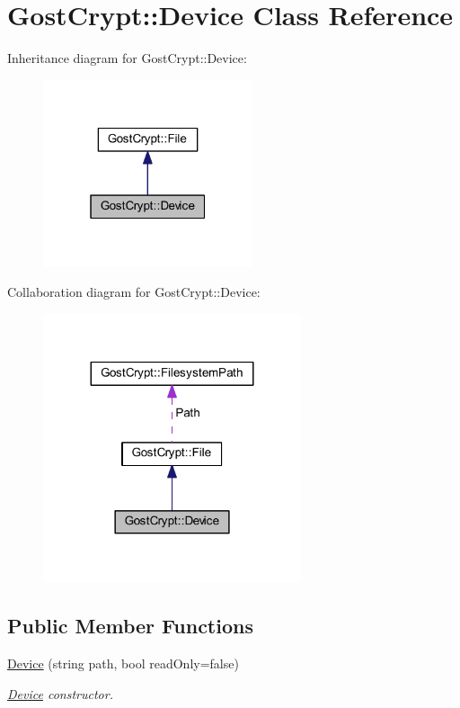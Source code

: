 \hypertarget{class_gost_crypt_1_1_device}{}\section{Gost\+Crypt\+:\+:Device Class Reference}
\label{class_gost_crypt_1_1_device}


Inheritance diagram for Gost\+Crypt\+:\+:Device\+:
\nopagebreak
\begin{figure}[H]
\begin{center}
\leavevmode
\includegraphics[width=175pt]{class_gost_crypt_1_1_device__inherit__graph}
\end{center}
\end{figure}


Collaboration diagram for Gost\+Crypt\+:\+:Device\+:
\nopagebreak
\begin{figure}[H]
\begin{center}
\leavevmode
\includegraphics[width=215pt]{class_gost_crypt_1_1_device__coll__graph}
\end{center}
\end{figure}
\subsection*{Public Member Functions}
\begin{DoxyCompactItemize}
\item 
\hyperlink{class_gost_crypt_1_1_device_a6640af23c02dcfc0a627ed7b84c2be2b}{Device} (string path, bool read\+Only=false)
\begin{DoxyCompactList}\small\item\em \hyperlink{class_gost_crypt_1_1_device}{Device} constructor. \end{DoxyCompactList}\end{DoxyCompactItemize}
